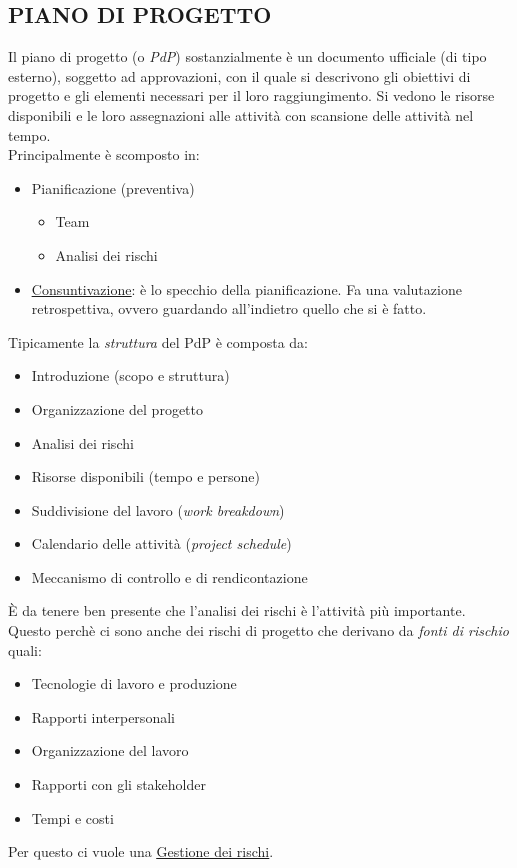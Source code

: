 		\subsection{PIANO DI PROGETTO}  \label{piano}
		Il piano di progetto (o \textit{PdP}) sostanzialmente è un documento ufficiale (di tipo esterno), soggetto ad approvazioni, con il quale si descrivono gli obiettivi di progetto e gli elementi necessari per il loro raggiungimento. Si vedono le risorse disponibili e le loro assegnazioni alle attività con scansione delle attività nel tempo. \\
		Principalmente è scomposto in:
			\begin{itemize}
				\item Pianificazione (preventiva)
					\begin{itemize}
						\item Team
						\item Analisi dei rischi
					\end{itemize}
				\item \underline{\hyperref[consuntivo]{Consuntivazione}}: è lo specchio della pianificazione. Fa una valutazione retrospettiva, ovvero guardando all'indietro quello che si è fatto.
			\end{itemize}
		Tipicamente la \textit{struttura} del PdP è composta da:
			\begin{itemize}
				\item Introduzione (scopo e struttura)
				\item Organizzazione del progetto
				\item Analisi dei rischi
				\item Risorse disponibili (tempo e persone)
				\item Suddivisione del lavoro (\textit{work breakdown})
				\item Calendario delle attività (\textit{project schedule})
				\item Meccanismo di controllo e di rendicontazione
			\end{itemize}
		È da tenere ben presente che l'analisi dei rischi è l'attività più importante. Questo perchè ci sono anche dei rischi di progetto che derivano da \textit{fonti di rischio} quali:
		\begin{itemize}
			\item Tecnologie di lavoro e produzione
			\item Rapporti interpersonali
			\item Organizzazione del lavoro
			\item Rapporti con gli stakeholder
			\item Tempi e costi
		\end{itemize}
		Per questo ci vuole una \underline{\hyperref[gestionerischi]{Gestione dei rischi}}.


